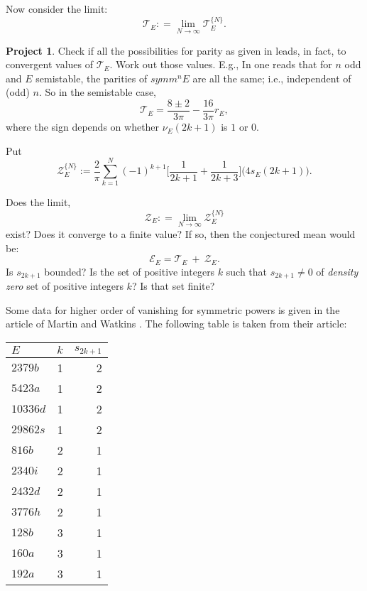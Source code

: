 \documentclass[11pt]{article}
\theoremstyle{plain}
\theoremstyle{definition}
\newtheorem{project}[theorem]{Project}
\numberwithin{equation}{section}
\numberwithin{figure}{section}
\numberwithin{table}{section}
\def\z{{\mathcal Z}}
\begin{document}
  Now consider the limit:
   $${\mathcal T}_E: = \lim_{N\to \infty}{\mathcal T}_E^{\{N\}}. $$
\vskip20pt
\begin{project} Check if all the possibilities for parity as given in \cite{DMW} leads, in fact, to convergent values of ${\mathcal T}_E$.  Work out those values. E.g., In \cite{DMW} one reads that for $n$ odd and $E$ semistable, the parities of $symm^nE$ are all the same;  i.e., independent of (odd) $n$. So in the semistable case, $${\mathcal T}_E = {\frac{8\pm 2}{3\pi}} -{\frac{16}{3\pi}}r_E,$$ where the sign depends on whether  $\nu_E(2k+1)$ is $1$ or $0$.\end{project}
\vskip20pt


Put $${\z}_E^{\{N\}}:= {\frac{2}{\pi}}\sum_{k=1}^{N}  (-1)^{k+1}\big[{\frac{1}{2k+1}} + {\frac{1}{2k+3}}\big]\big(4s_E(2k+1)\big).$$

\vskip20pt
 Does the limit, $${\z}_E: = \lim_{N\to \infty}{\z}_E^{\{N\}} $$  exist? Does it converge to a finite value?  If so, then the conjectured mean would be:
$${\mathcal E}_E =  {\mathcal T}_E \ + \ \z_E.$$   Is $s_{2k+1}$ bounded?  Is  the set of positive integers $k$ such that  $s_{2k+1} \ne 0$ of {\it density zero} set of positive integers $k$?    Is that set finite?



 Some data for higher order of vanishing for symmetric powers is given in the article of Martin and Watkins \cite{M-W}. The following table is taken from their article:


\hskip160pt\begin{tabular} {l | r r}\hline
$E$ & $k$ & $s_{2k+1}$\\
\hline\hline
$2379b$ & 1 & 2 \\
\hline
$5423a$ &  1 & 2   \\
\hline
$10336d$ &  1 & 2  \\
\hline
$29862s$ &  1 & 2  \\
\hline
$816b$ &  2 & 1  \\
\hline
$2340i$ &  2 & 1  \\
\hline
$2432d$ &  2 & 1  \\
\hline
$3776h$ &  2 & 1  \\
\hline
$128b$ &  3 & 1  \\
\hline
$160a$ &  3 & 1  \\
\hline
$192a$ & 3 & 1  \\
\hline
\end{tabular}

\vskip40pt
\end{document}
